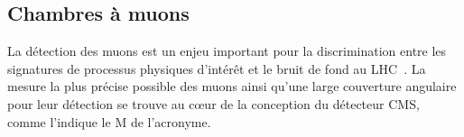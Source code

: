 \subsection{Chambres à muons}\label{chapter-LHC-section-CMS-subsec-muons}
La détection des muons est un enjeu important pour la discrimination entre les signatures de processus physiques d'intérêt et le bruit de fond au LHC~\cite{cms_paper}.
La mesure la plus précise possible des muons ainsi qu'une large couverture angulaire pour leur détection se trouve au cœur de la conception du détecteur CMS, comme l'indique le \og M \fg{} de l'acronyme.
%
%
%
%
%
